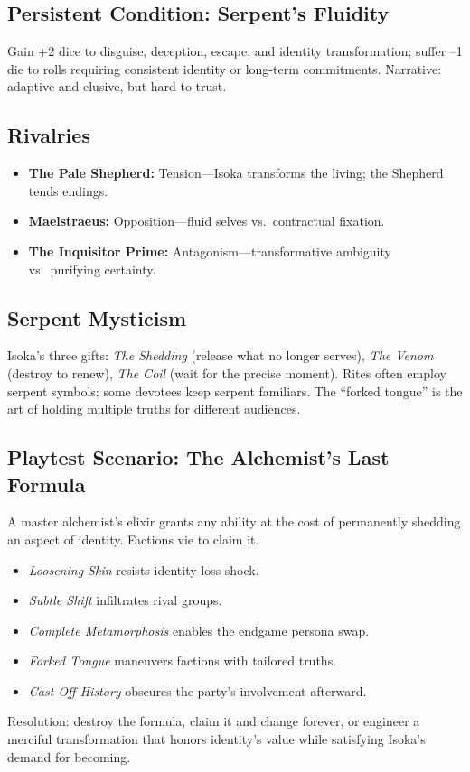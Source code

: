 \subsection*{Persistent Condition: Serpent's Fluidity}
Gain +2 dice to disguise, deception, escape, and identity transformation; suffer --1 die to rolls requiring consistent identity or long-term commitments. Narrative: adaptive and elusive, but hard to trust.

\subsection*{Rivalries}
\begin{itemize}
\item \textbf{The Pale Shepherd:} Tension---Isoka transforms the living; the Shepherd tends endings.  
\item \textbf{Maelstraeus:} Opposition---fluid selves vs.\ contractual fixation.  
\item \textbf{The Inquisitor Prime:} Antagonism---transformative ambiguity vs.\ purifying certainty.  
\end{itemize}

\subsection*{Serpent Mysticism}
Isoka’s three gifts: \emph{The Shedding} (release what no longer serves), \emph{The Venom} (destroy to renew), \emph{The Coil} (wait for the precise moment). Rites often employ serpent symbols; some devotees keep serpent familiars. The ``forked tongue'' is the art of holding multiple truths for different audiences.

\subsection*{Playtest Scenario: The Alchemist's Last Formula}
A master alchemist’s elixir grants any ability at the cost of permanently shedding an aspect of identity. Factions vie to claim it.  
\begin{itemize}
\item \emph{Loosening Skin} resists identity-loss shock.  
\item \emph{Subtle Shift} infiltrates rival groups.  
\item \emph{Complete Metamorphosis} enables the endgame persona swap.  
\item \emph{Forked Tongue} maneuvers factions with tailored truths.  
\item \emph{Cast-Off History} obscures the party’s involvement afterward.  
\end{itemize}
Resolution: destroy the formula, claim it and change forever, or engineer a merciful transformation that honors identity’s value while satisfying Isoka’s demand for becoming.
